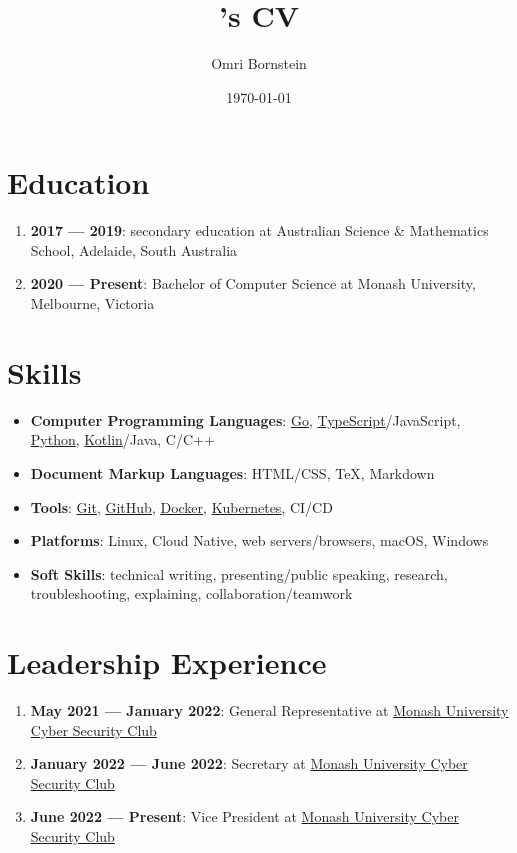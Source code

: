 \documentclass[a4paper, 10pt]{article}
\author{Omri Bornstein}
\title{\theauthor's CV}
\date{\today}
\begin{document}
	\section{Education}
	\begin{enumerate}
		\item \textbf{2017 --- 2019}: secondary education at Australian Science \& Mathematics School, Adelaide, South Australia
		\item \textbf{2020 --- Present}: Bachelor of Computer Science at Monash University, Melbourne, Victoria
	\end{enumerate}

	\section{Skills}
	\begin{itemize}
		\item \textbf{Computer Programming Languages}: \href{https://go.dev}{Go}, \href{https://typescriptlang.org}{TypeScript}/JavaScript, \href{https://python.org/}{Python}, \href{https://kotlinlang.org}{Kotlin}/Java, C/C++
		\item \textbf{Document Markup Languages}: HTML/CSS, \TeX, Markdown
		\item \textbf{Tools}: \href{https://git-scm.com}{Git}, \href{https://github.com}{GitHub}, \href{https://www.docker.com}{Docker}, \href{https://kubernetes.io/}{Kubernetes}, CI/CD
		\item \textbf{Platforms}: Linux, Cloud Native, web servers/browsers, macOS, Windows
		\item \textbf{Soft Skills}: technical writing, presenting/public speaking, research, troubleshooting, explaining, collaboration/teamwork
	\end{itemize}

	\section{Leadership Experience}
	\begin{enumerate}
		\item \textbf{May 2021 --- January 2022}: General Representative at \href{https://monsec.io/team/}{Monash University Cyber Security Club}
		\item \textbf{January 2022 --- June 2022}: Secretary at \href{https://monsec.io/team/}{Monash University Cyber Security Club}
		\item \textbf{June 2022 --- Present}: Vice President at \href{https://monsec.io/team/}{Monash University Cyber Security Club}
	\end{enumerate}
\end{document}
